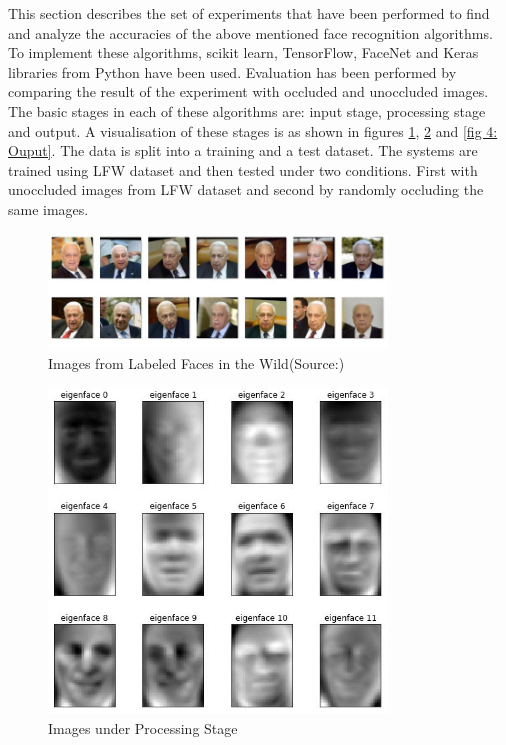 \documentclass[conference]{IEEEtran}
\begin{document}
This section describes the set of experiments that have been performed to find and analyze the accuracies of the above mentioned face recognition algorithms. To implement these algorithms, scikit learn, TensorFlow, FaceNet \cite{schroff2015facenet} and Keras libraries from Python have been used. Evaluation has been performed by comparing the result of the experiment with occluded and unoccluded images. The basic stages in each of these algorithms are: input stage, processing stage and output. A visualisation of these stages is as shown in figures \ref{fig 2: dataset}, \ref{fig 3:Processing Stage} and \ref{fig 4: Ouput}. The data is split into a training and a test dataset. The systems are trained using LFW dataset and then tested under two conditions. First with unoccluded images from LFW dataset and second by randomly occluding the same images.

\begin{figure}[h!]
 \centering
 \includegraphics[width = 9cm]{dataset.JPG}
  \caption{ Images from Labeled Faces in the Wild(Source:\cite{LFWTech})}
 \label{fig 2: dataset}
\end{figure}

\begin{figure}[h!]
 \centering
 \includegraphics[width = 9cm]{eigenface.JPG}
 \caption{ Images under Processing Stage}
 \label{fig 3:Processing Stage}
\end{figure}
\end{document}
